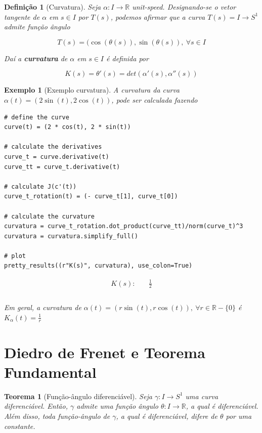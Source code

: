 \documentclass[12pt]{article}
\newtheorem{ex}{Exemplo}[section]
\newtheorem{theorem}{Teorema}
\newtheorem{definition}{Definição}
\begin{document}
\begin{definition}[Curvatura]
Seja $\alpha: I \rightarrow \mathbb{R}$ unit-speed. Designando-se o vetor tangente de $\alpha$ em $s \in I$ por $T(s)$, podemos afirmar que a curva $T(s) = I \rightarrow S^1$ admite função ângulo

$$T(s) = (\cos(\theta(s)), \sin(\theta(s)),\ \forall s \in I$$

Daí a \textbf{curvatura} de $\alpha$ em $s \in I$ é definida por

$$K(s) = \theta'(s) = det(\alpha'(s), \alpha''(s))$$
\end{definition}

\begin{ex}[Exemplo curvatura] A curvatura da curva $\alpha(t) = (2\sin(t), 2\cos(t))$, pode ser calculada fazendo
\begin{lstlisting}
# define the curve
curve(t) = (2 * cos(t), 2 * sin(t))

# calculate the derivatives
curve_t = curve.derivative(t)
curve_tt = curve_t.derivative(t)

# calculate J(c'(t))
curve_t_rotation(t) = (- curve_t[1], curve_t[0])

# calculate the curvature
curvatura = curve_t_rotation.dot_product(curve_tt)/norm(curve_t)^3
curvatura = curvatura.simplify_full()

# plot
pretty_results((r"K(s)", curvatura), use_colon=True)
\end{lstlisting}

\newcommand{\Bold}[1]{\mathbf{#1}}\begin{align*} K(s) :& \quad \frac{1}{2} \\ \end{align*} \\

Em geral, a curvatura de $\alpha(t) = (r \sin(t), r \cos(t)),\ \forall r \in \mathbb{R} - \{0\}$ é $K_\alpha(t) = \frac{1}{r}$
\end{ex}

\section{Diedro de Frenet e Teorema Fundamental}\label{s4}
\begin{theorem}[Função-ângulo diferenciável]
Seja $\gamma: I \rightarrow S^1$ uma curva diferenciável. Então, $\gamma$ admite uma função ângulo $\theta: I \rightarrow \mathbb{R}$, a qual é diferenciável. Além disso, toda função-ângulo de $\gamma$, a qual é diferenciável, difere de $\theta$ por uma constante.
\end{theorem}
\end{document}
